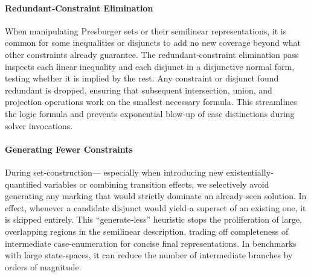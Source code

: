 \paragraph{Redundant‐Constraint Elimination}
When manipulating Presburger sets or their semilinear representations, it is common for some inequalities or disjuncts to add no new coverage beyond what other constraints already guarantee.  The redundant‐constraint elimination pass inspects each linear inequality and each disjunct in a disjunctive normal form, testing whether it is implied by the rest.  Any constraint or disjunct found redundant is dropped, ensuring that subsequent intersection, union, and projection operations work on the smallest necessary formula.  This streamlines the logic formula and prevents exponential blow‐up of case distinctions during solver invocations.
%

\paragraph{Generating Fewer Constraints}
During set‐construction--- especially when introducing new existentially‐quantified variables or combining transition effects, we selectively avoid generating any marking that would strictly dominate an already‐seen solution.  In effect, whenever a candidate disjunct would yield a superset of an existing one, it is skipped entirely.  This ``generate‐less” heuristic stops the proliferation of large, overlapping regions in the semilinear description, trading off completeness of intermediate case‐enumeration for concise final representations.  In benchmarks with large state‐spaces, it can reduce the number of intermediate branches by orders of magnitude.


